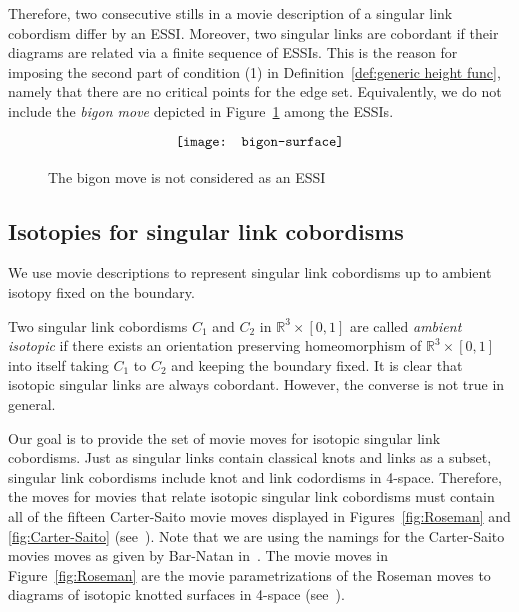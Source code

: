 \documentclass{amsart}\usepackage{amsfonts, amsmath, amssymb}\usepackage{graphicx, epic, epsf, enumerate, stmaryrd}
\theoremstyle{definition}
\numberwithin{equation}{section}
\begin{document}
Therefore, two consecutive stills in a movie description of a singular link cobordism differ by an ESSI. 
Moreover, two singular links are cobordant if their diagrams are related via a finite sequence of ESSIs.
This is the reason for imposing  the second part of condition (1) in Definition~\ref{def:generic height func}, namely that there are no critical points for the edge set. 
Equivalently, we do not include the \textit{bigon move} depicted in Figure~\ref{fig:bigon} among the ESSIs. 
\begin{figure}[ht]
\[  \raisebox{5pt}{\texttt{[image: bigon-surface]}}  \]
\caption{The bigon move is not considered as an ESSI}
\label{fig:bigon}
\end{figure}

\subsection{Isotopies for singular link cobordisms}

We use movie descriptions to represent singular link cobordisms up to ambient isotopy fixed on the boundary. 

Two singular link cobordisms $C_1$ and $C_2$ in ${\mathbb{R}}^3\times[0, 1]$ are called \textit {ambient isotopic} if there exists an orientation preserving homeomorphism of ${\mathbb{R}}^3 \times [0,1]$ into itself taking $C_1$ to $C_2$ and keeping the boundary fixed.
It is clear that isotopic singular links are always cobordant. However, the converse is not true in general.

Our goal is to provide the set of movie moves for isotopic singular link cobordisms. Just as singular links contain classical knots and links as a subset, singular link cobordisms include knot and link codordisms in 4-space. Therefore, the moves for movies that relate isotopic singular link cobordisms must contain all of the fifteen Carter-Saito movie moves displayed in Figures~\ref{fig:Roseman} and \ref{fig:Carter-Saito} (see~\cite{CS}).
Note that we are using the namings for the Carter-Saito movies moves as given by Bar-Natan in~\cite{BN}. The movie moves in Figure~\ref{fig:Roseman} are the movie parametrizations of the Roseman moves to diagrams of isotopic knotted surfaces in 4-space (see~\cite{Ros}).
\end{document}
